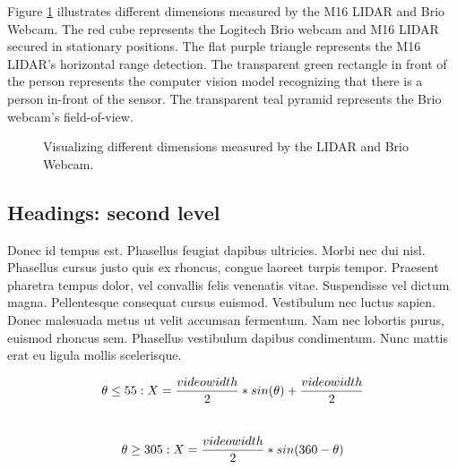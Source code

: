 \documentclass{article}
\begin{document}
		Figure \ref{fig:fig1}  illustrates different dimensions measured by the M16 LIDAR and Brio Webcam.
		The red cube represents the Logitech Brio webcam and M16 LIDAR secured in stationary positions.
		The flat purple triangle represents the M16 LIDAR's horizontal range detection.
		The transparent green rectangle in front of the person represents the computer vision model recognizing that there is a person in-front of the sensor.
    The transparent teal pyramid represents the Brio webcam's field-of-view.

    \begin{figure}
      \centering
      \caption{Visualizing different dimensions measured by the LIDAR and Brio Webcam.}
      \label{fig:fig1}
    \end{figure}



\subsection{Headings: second level}
Donec id tempus est. Phasellus feugiat dapibus ultricies. Morbi nec dui nisl. Phasellus cursus justo quis ex rhoncus, congue laoreet turpis tempor. Praesent pharetra tempus dolor, vel convallis felis venenatis vitae. Suspendisse vel dictum magna. Pellentesque consequat cursus euismod. Vestibulum nec luctus sapien. Donec malesuada metus ut velit accumsan fermentum. Nam nec lobortis purus, euismod rhoncus sem. Phasellus vestibulum dapibus condimentum. Nunc mattis erat eu ligula mollis scelerisque. 

\begin{equation} \label{eq1}
  \theta \leq  55:
  X = \frac{video width}{2} * sin(\theta) + \frac{video width}{2}\\
\end{equation}
\\
\begin{equation} \label{eq2}
  \theta \geq 305:
  X = \frac{video width}{2} * sin(360 - \theta)\\
\end{equation}
  
\end{document}
